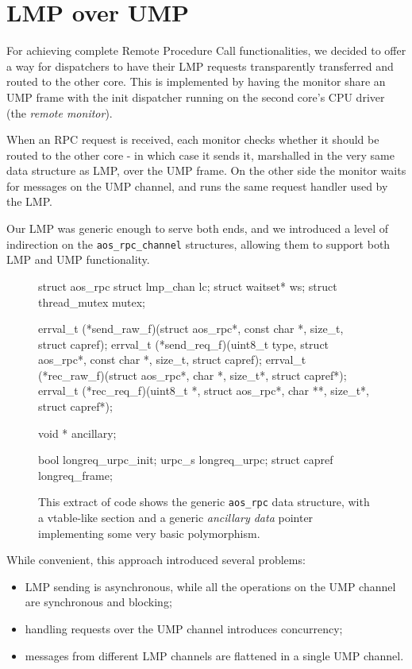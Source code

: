 \documentclass[a4paper,twoside,openright]{report}
\begin{document}
\section{LMP over UMP}
For achieving complete Remote Procedure Call functionalities, we decided to offer a way for dispatchers to have their LMP requests transparently transferred and routed to the other core. This is implemented by having the monitor share an UMP frame with the init dispatcher running on the second core's CPU driver (the \emph{remote monitor}).

When an RPC request is received, each monitor checks whether it should be routed to the other core - in which case it sends it, marshalled in the very same data structure as LMP, over the UMP frame. On the other side the monitor waits for messages on the UMP channel, and runs the same request handler used by the LMP.

Our LMP was generic enough to serve both ends, and we introduced a level of indirection on the \texttt{aos\_rpc\_channel} structures, allowing them to support both LMP and UMP functionality.


\begin{figure} [ht]
	\begin{pandacode}
struct aos_rpc 
	struct lmp_chan lc;
	struct waitset* ws;
	struct thread_mutex mutex;
	
	errval_t (*send_raw_f)(struct aos_rpc*, const char *,
				size_t, struct capref);
	errval_t (*send_req_f)(uint8_t type, struct aos_rpc*, const char *,
				size_t, struct capref);
	errval_t (*rec_raw_f)(struct aos_rpc*, char *,
				size_t*, struct capref*);
	errval_t (*rec_req_f)(uint8_t *, struct aos_rpc*, char **,
				size_t*, struct capref*);
				
	void * ancillary;
	
	bool longreq_urpc_init;
	urpc_s longreq_urpc;
	struct capref longreq_frame;
\end{pandacode}
	\caption{This extract of code shows the generic \texttt{aos\_rpc} data structure, with a vtable-like section and a generic \textit{ancillary data} pointer implementing some very basic polymorphism.}
\end{figure}

While convenient, this approach introduced several problems: 
\begin{itemize}
	\item LMP sending is asynchronous, while all the operations on the UMP channel are synchronous and blocking;
	\item handling requests over the UMP channel introduces concurrency;
	\item messages from different LMP channels are flattened in a single UMP channel.
\end{itemize}
\end{document}
